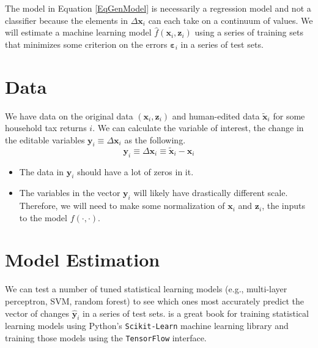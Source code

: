 \documentclass[letterpaper,12pt]{article}
\theoremstyle{definition}
\newcommand\ve{\varepsilon}
\begin{document}
  The model in Equation \eqref{EqGenModel} is necessarily a regression model and not a classifier because the elements in $\Delta\bm{x}_i$ can each take on a continuum of values. We will estimate a machine learning model $\hat{f}\left(\bm{x}_i,  \bm{z}_i\right)$ using a series of training sets that minimizes some criterion on the errors $\bm{\ve}_i$ in a series of test sets.


\section{Data}\label{SecData}

  We have data on the original data $\left(\bm{x}_i,\bm{z}_i\right)$ and human-edited data $\bm{\tilde{x}}_i$ for some household tax returns $i$. We can calculate the variable of interest, the change in the editable variables $\bm{y}_i\equiv\Delta\bm{x}_i$ as the following.
  \begin{equation}\label{EqXchange}
    \bm{y}_i \equiv \Delta\bm{x}_i \equiv \bm{\tilde{x}}_i - \bm{x}_i
  \end{equation}

  \begin{itemize}
    \item The data in $\bm{y}_i$ should have a lot of zeros in it.
    \item The variables in the vector $\bm{y}_i$ will likely have drastically different scale. Therefore, we will need to make some normalization of $\bm{x}_i$ and $\bm{z}_i$, the inputs to the model $f(\cdot,\cdot)$.
  \end{itemize}


\section{Model Estimation}\label{SecEstimation}

  We can test a number of tuned statistical learning models (e.g., multi-layer perceptron, SVM, random forest) to see which ones most accurately predict the vector of changes $\hat{\bm{y}}_i$ in a series of test sets. \citet{Geron:2017} is a great book for training statistical learning models using Python's \texttt{Scikit-Learn} machine learning library and training those models using the \texttt{TensorFlow} interface.



\end{document}
